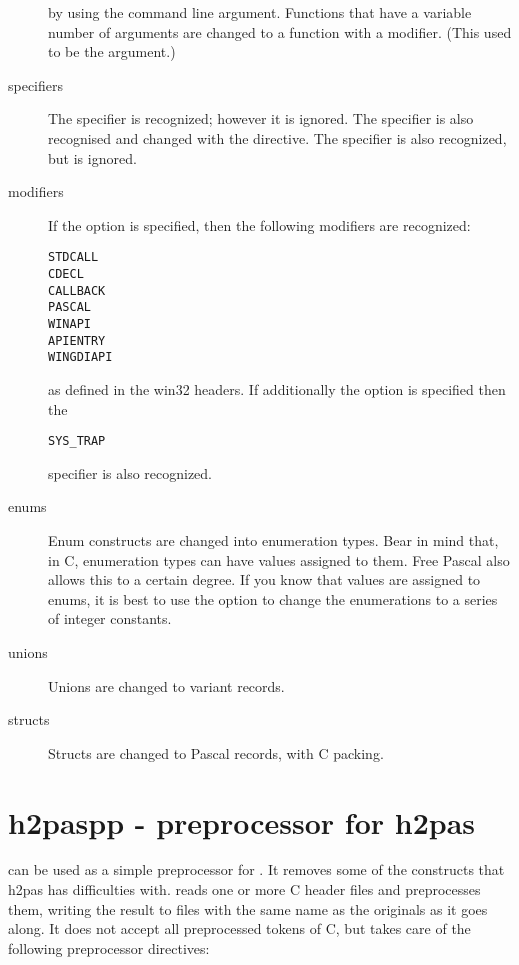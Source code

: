 \begin{description}
by using the  command line argument. Functions that have a 
variable number of arguments are changed to a function with a 
modifier. (This used to be the  argument.)
\item[specifiers]
The  specifier is recognized; however it is ignored. 
The  specifier is also recognised and changed with the
 directive. The  specifier is also 
recognized, but is ignored.
\item[modifiers] 
If the  option is specified, then the following modifiers are recognized:
\begin{verbatim}
STDCALL
CDECL
CALLBACK
PASCAL
WINAPI
APIENTRY
WINGDIAPI
\end{verbatim}
as defined in the win32 headers. If additionally the 
option is specified then the  
\begin{verbatim}
SYS_TRAP
\end{verbatim}
specifier is also recognized.
\item[enums]
Enum constructs are changed into enumeration types. Bear in mind that, in C,
enumeration types can have values assigned to them. Free Pascal also allows
this to a certain degree. If you know that values are assigned to enums, it
is best to use the  option to change the enumerations to a series of 
integer  constants.

\item[unions] Unions are changed to variant records. 
\item[structs] Structs are changed to Pascal records, with C packing.
\end{description}

\section{h2paspp - preprocessor for h2pas}
 can be used as a simple preprocessor for . It
removes some of the constructs that h2pas has difficulties with. 
 reads one or more C header files and preprocesses them, writing the result 
to files with the same name as the originals as it goes along. 
It does not accept all preprocessed tokens of C, but takes care of the following 
preprocessor directives:

